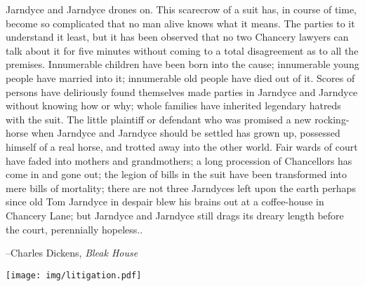
\epigraph{Jarndyce and Jarndyce drones on. This scarecrow of a suit has, in course of time, become so complicated that no man alive knows what it means. The parties to it understand it least, but it has been observed that no two Chancery lawyers can talk about it for five minutes without coming to a total disagreement as to all the premises. Innumerable children have been born into the cause; innumerable young people have married into it; innumerable old people have died out of it. Scores of persons have deliriously found themselves made parties in Jarndyce and Jarndyce without knowing how or why; whole families have inherited legendary hatreds with the suit. The little plaintiff or defendant who was promised a new rocking-horse when Jarndyce and Jarndyce should be settled has grown up, possessed himself of a real horse, and trotted away into the other world. Fair wards of court have faded into mothers and grandmothers; a long procession of Chancellors has come in and gone out; the legion of bills in the suit have been transformed into mere bills of mortality; there are not three Jarndyces left upon the earth perhaps since old Tom Jarndyce in despair blew his brains out at a coffee-house in Chancery Lane; but Jarndyce and Jarndyce still drags its dreary length before the court,  perennially hopeless..}{--Charles Dickens, \textit{Bleak House}}
\vspace*{\fill}
\begin{fullwidth}
\begin{center}
    \texttt{[image: img/litigation.pdf]}
\end{center}
\end{fullwidth}
